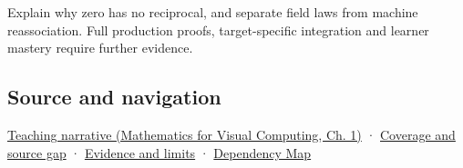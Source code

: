 Explain why zero has no reciprocal, and separate field laws from machine reassociation. Full production proofs, target-specific integration and learner mastery require further evidence.

\subsection{Source and navigation}\label{appendix-52051ad550fe-source-and-navigation}

\href{../02-Mathematics-for-Visual-Computing/main.pdf\#nameddest=01-foundations-i-ch017-numbers-become-a-system-of-permitted-operations}{Teaching narrative (Mathematics for Visual Computing, Ch. 1)} · \hyperref[appendix-fd090d982a15-phase-6---parts-501-600]{Coverage and source gap} · \hyperref[appendix-a103e7846d21-phase-6---source-analysis-and-verification]{Evidence and limits} · \hyperref[appendix-4ad47bdd269a]{Dependency Map}
